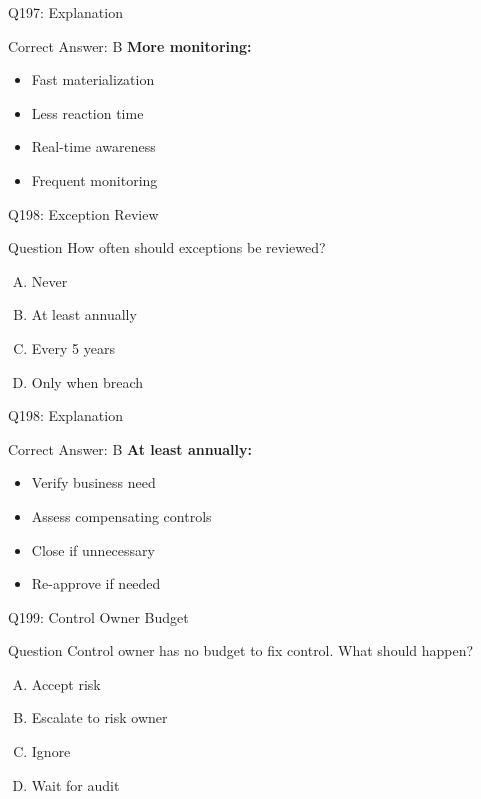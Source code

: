 \documentclass{beamer}
\begin{document}
	\begin{frame}{Q197: Explanation}
		\begin{block}{Correct Answer: B}
			\textbf{More monitoring:}
			\begin{itemize}
				\item Fast materialization
				\item Less reaction time
				\item Real-time awareness
				\item Frequent monitoring
			\end{itemize}
		\end{block}
	\end{frame}
	
	\begin{frame}{Q198: Exception Review}
		\begin{block}{Question}
			How often should exceptions be reviewed?
		\end{block}
		\begin{enumerate}[(A)]
			\item Never
			\item At least annually
			\item Every 5 years
			\item Only when breach
		\end{enumerate}
	\end{frame}
	
	\begin{frame}{Q198: Explanation}
		\begin{block}{Correct Answer: B}
			\textbf{At least annually:}
			\begin{itemize}
				\item Verify business need
				\item Assess compensating controls
				\item Close if unnecessary
				\item Re-approve if needed
			\end{itemize}
		\end{block}
	\end{frame}
	
	\begin{frame}{Q199: Control Owner Budget}
		\begin{block}{Question}
			Control owner has no budget to fix control. What should happen?
		\end{block}
		\begin{enumerate}[(A)]
			\item Accept risk
			\item Escalate to risk owner
			\item Ignore
			\item Wait for audit
		\end{enumerate}
	\end{frame}
	
\end{document}
